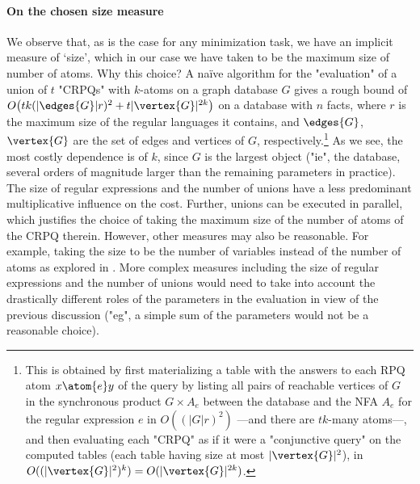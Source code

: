 \paragraph{On the chosen size measure}
  We observe that, as is the case for any minimization task, we have an implicit measure of `size', which in our case we have taken to be the maximum size of number of atoms.
  Why this choice?
  A naïve algorithm for the "evaluation" of a union of $t$ "CRPQs" with $k$-atoms on a graph database $G$ gives a rough bound of $O\big(t  k  (|\edges{G}|  r)^2 + t  |\vertex{G}|^{2k}\big)$ on a database with $n$ facts, where $r$ is the maximum size of the regular languages it contains, and $\edges{G}$, $\vertex{G}$ are the set of edges and vertices of $G$, respectively.\footnote{This is obtained by first materializing a table with the answers to each RPQ atom $x \atom{e} y$ of the query by listing all pairs of reachable vertices of $G$ in the synchronous product $G \times A_e$ between the database and the NFA $A_e$ for the regular expression $e$ in $O((|G|r)^2)$ ---and there are $tk$-many atoms---, and then evaluating each "CRPQ" as if it were a "conjunctive query" on the computed tables (each table having size at most $|\vertex{G}|^2$), in $O((|\vertex{G}|^2)^k) = O(|\vertex{G}|^{2k})$.}
  As we see, the most costly dependence is of $k$, since $G$ is the largest object ("ie", the database, several orders of magnitude larger than the remaining parameters in practice). The size of regular expressions and the number of unions have a less predominant multiplicative influence on the cost.
  Further, unions can be executed in parallel, which justifies the choice of taking the maximum size of the number of atoms of the CRPQ therein.
  However, other measures may also be reasonable. For example, taking the size to be the number of variables instead of the number of atoms as explored in .
  More complex measures including the size of regular expressions and the number of unions would need to take into account the drastically different roles of the parameters in the evaluation in view of the previous discussion ("eg", a simple sum of the parameters would not be a reasonable choice).



